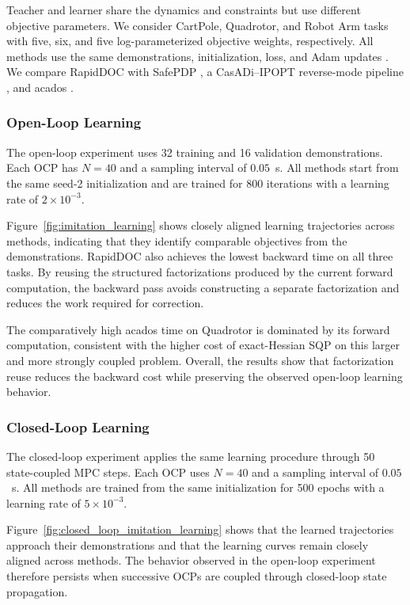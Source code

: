 \documentclass[letterpaper,10pt,conference]{ieeeconf}
\begin{document}
Teacher and learner share the dynamics and constraints but use
different objective parameters. We consider CartPole, Quadrotor, and
Robot Arm tasks with five, six, and five log-parameterized objective
weights, respectively. All methods use the same demonstrations,
initialization, loss, and Adam updates \cite{kingma2015adam}. We compare RapidDOC with SafePDP \cite{jin2021safepdp}, a
CasADi--IPOPT reverse-mode pipeline \cite{andersson2019casadi},
and acados \cite{verschueren2022acados}.

\subsubsection{Open-Loop Learning}

The open-loop experiment uses 32 training and 16 validation
demonstrations. Each OCP has $N=40$ and a sampling interval of
$0.05$~s. All methods start from the same seed-2 initialization and
are trained for 800 iterations with a learning rate of
$2\times10^{-3}$.

Figure~\ref{fig:imitation_learning} shows closely aligned learning
trajectories across methods, indicating that they identify comparable
objectives from the demonstrations. RapidDOC also achieves the lowest
backward time on all three tasks. By reusing the structured factorizations
produced by the current forward computation, the backward pass avoids
constructing a separate factorization and reduces the work required
for correction.

The comparatively high acados time on Quadrotor is dominated by its
forward computation, consistent with the higher cost of exact-Hessian SQP on
this larger and more strongly coupled problem. Overall, the results
show that factorization reuse reduces the backward cost while preserving the
observed open-loop learning behavior.

\subsubsection{Closed-Loop Learning}

The closed-loop experiment applies the same learning procedure through
50 state-coupled MPC steps. Each OCP uses $N=40$ and a sampling interval
of $0.05$~s. All methods are trained from the same initialization for
500 epochs with a learning rate of $5\times10^{-3}$.

Figure~\ref{fig:closed_loop_imitation_learning} shows that the learned
trajectories approach their demonstrations and that the learning curves
remain closely aligned across methods. The behavior observed in the
open-loop experiment therefore persists when successive OCPs are
coupled through closed-loop state propagation.
\end{document}
